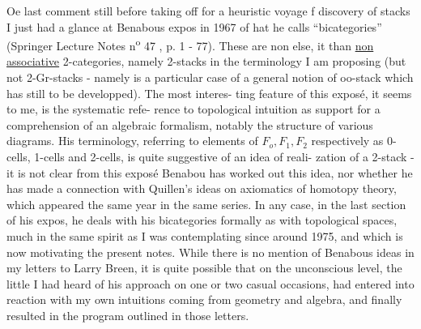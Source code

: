 Oe last comment still before taking off for a heuristic voyage
f discovery of stacks\hand{!} I just had a glance at Benabous expos in 1967
of hat he calls ``bicategories''  (Springer Lecture Notes n\textsuperscript{o} 47 ,  p. 1
- 77).  These are non else,  it \hand{,}  than \deleted{(}\uline{non associative}
2-categories,  namely 2-stacks  in the terminology I am proposing
(but not 2-Gr-stacks  -  namely  is a particular case of a general
notion of oo-stack which  has still to be developped).  The most interes-%
\hand{-}ting feature of this exposé,  it seems to me,  is the systematic refe-%
rence to topological intuition as  support for a comprehension of an
algebraic formalism,  notably  the structure of various diagrams. His
terminology,  referring to elements of $F_o,F_1,F_2$ respectively as 0-cells,
1-cells and 2-cells,  is quite suggestive of an idea of   reali-%
zation of a 2-stack  -  it is not clear from this exposé  Benabou
has worked out this idea,  nor whether he has made a connection with
Quillen's ideas on axiomatics of homotopy theory,  which appeared the
same year in the same series. In any case,  in the last section of his
expos,  he deals with his bicategories formally as with topological
spaces,  much in the same spirit as \hand{(} I was contemplating since 
around 1975,  and which is now motivating the present notes.  While
there is no mention of Benabous ideas in my letters to Larry Breen,
it is quite possible that on the unconscious level,  the little I had
heard of his approach on one or two casual occasions,  had entered into
reaction with my own intuitions\hand{,} coming  from geometry and 
algebra,  and finally resulted in the program outlined in those letters.

